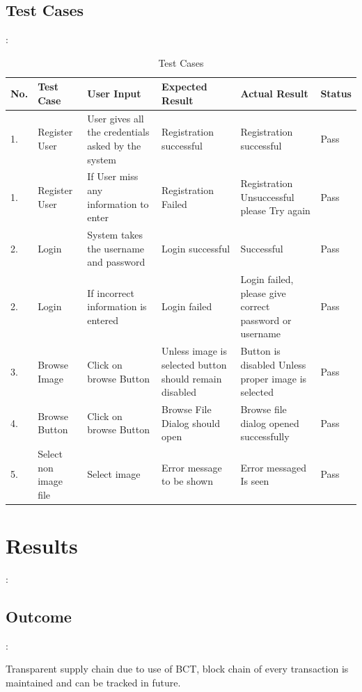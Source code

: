 \documentclass[oneside,a4paper,12pt]{report}
\begin{document}
{\section{Test Cases}:
\begin{table}[!htbp]
	\begin{center}
		\def\arraystretch{1.5}
		\begin{tabular}{| p{0.5cm} | p{1.5cm} |p{2.5cm}| p{2.5cm} | p{2.5cm} | p{1cm}| }
			\hline
			\textbf{No.} &	\textbf{Test Case}	& \textbf{User Input}& \textbf{Expected Result}	& \textbf{Actual Result} &	\textbf{Status} \\ \hline
			1.&	Register User&	User gives all the
			credentials asked
			by the system&	Registration successful&	Registration successful&	Pass\\ \hline
			1.&	Register User&	If User miss any
			information to
			enter&	Registration
			Failed&	Registration
			Unsuccessful please
			Try again&	Pass\\ \hline
			2.&	Login&	System takes the
			username and password&	Login successful&	Successful&	Pass\\ \hline
			2.&	Login&	If incorrect information is entered&	Login failed&	Login failed, please give correct password
			or username&	Pass\\ \hline
			3.&	Browse
			Image&	Click on browse
			Button&	Unless image is
			selected button
			should remain
			disabled&	Button is disabled
			Unless proper image
			is selected&	Pass\\ \hline
			4.&	Browse
			Button&	Click on browse
			Button&	Browse File Dialog should open&	Browse file dialog opened successfully&	Pass\\ \hline
			5.&	Select non
			image file&	Select image&	Error message to be shown&	Error messaged
			Is seen&	Pass\\ \hline
		\end{tabular}
		\caption {Test Cases}
		\label{tab:Test Cases}
	\end{center}
\end{table}

\chapter{Results}:

\section{Outcome}:

Transparent supply chain due to use of BCT, block chain of every transaction is maintained and can be tracked in future. 

}
\end{document}
